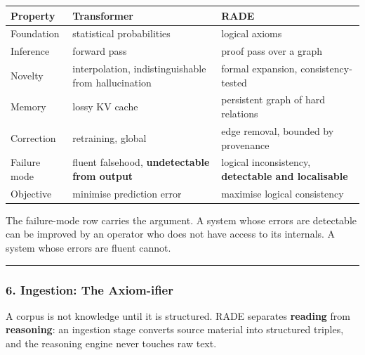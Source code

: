 \documentclass[
  11pt,
  a4paper,
]{article}
\begin{document}
\begin{longtable}[]{@{}
  >{\raggedright\arraybackslash}p{}
  >{\raggedright\arraybackslash}p{}
  >{\raggedright\arraybackslash}p{}@{}}
\toprule\noalign{}
\begin{minipage}[b]{\linewidth}\raggedright
Property
\end{minipage} & \begin{minipage}[b]{\linewidth}\raggedright
Transformer
\end{minipage} & \begin{minipage}[b]{\linewidth}\raggedright
RADE
\end{minipage} \\
\midrule\noalign{}
\endhead
\bottomrule\noalign{}
\endlastfoot
Foundation & statistical probabilities & logical axioms \\
Inference & forward pass & proof pass over a graph \\
Novelty & interpolation, indistinguishable from hallucination & formal
expansion, consistency-tested \\
Memory & lossy KV cache & persistent graph of hard relations \\
Correction & retraining, global & edge removal, bounded by provenance \\
Failure mode & fluent falsehood, \textbf{undetectable from output} &
logical inconsistency, \textbf{detectable and localisable} \\
Objective & minimise prediction error & maximise logical consistency \\
\end{longtable}

The failure-mode row carries the argument. A system whose errors are
detectable can be improved by an operator who does not have access to
its internals. A system whose errors are fluent cannot.

\begin{center}\rule{0.5\linewidth}{0.5pt}\end{center}

\subsubsection{6. Ingestion: The
Axiom-ifier}\label{ingestion-the-axiom-ifier}

A corpus is not knowledge until it is structured. RADE separates
\textbf{reading} from \textbf{reasoning}: an ingestion stage converts
source material into structured triples, and the reasoning engine never
touches raw text.
\end{document}

